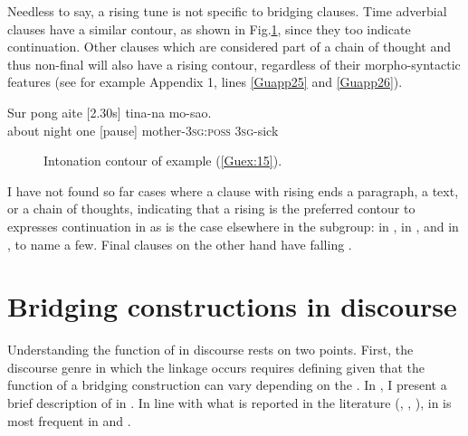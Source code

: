\documentclass[output=paper]{LSP/langsci}
\begin{document}
Needless to say, a rising tune is not specific to bridging clauses. Time adverbial clauses have a similar  contour, as shown in Fig.\ref{GuF5}, since they too indicate continuation. Other clauses which are considered part of a chain of thought and thus non-final will also have a rising  contour, regardless of their morpho-syntactic features (see for example Appendix 1, lines \ref{Guapp25} and \ref{Guapp26}). 

\begin{exe}
\ex \label{Guex:15}
\gll Sur     pong  aite [2.30s]   tina-na                mo-sao.\\     	       
about   night one      [pause]   mother-\textsc{3sg:poss}   \textsc{3sg}-sick \\
\glt {} 
\end{exe}


\begin{figure}[ht]
\caption{Intonation contour of example (\ref{Guex:15}). \label{GuF5}}
\end{figure}

I have not found so far cases where a clause with rising  ends a paragraph, a text, or a chain of thoughts, indicating that a rising  is the preferred contour to expresses continuation in  as is the case elsewhere in the  subgroup: in  \citep[][521]{Lichtenberk83}, in  \citep[][63]{Schokkin13}, and in  \citep[][38]{Schneider10}, to name a few. Final clauses on the other hand have falling . 


\section{Bridging constructions in discourse} 
\label{Gusec:Understanding}
Understanding the function of  in discourse rests on two points. First, the discourse genre in which the linkage occurs requires defining given that the function of a bridging construction can vary depending on the  \citep{devries.2005}. In , I present a brief description of  in . In line with what is reported in the literature (\citealt[][9]{longacre83},  \citealt[][365]{devries.2005}, \citealt[][274]{Thompson.et.al.2007}),  in  is most frequent in  and .   
\end{document}
